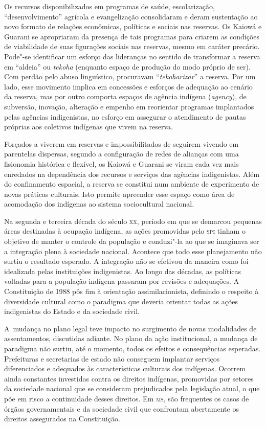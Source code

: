 Os recursos disponibilizados em programas de saúde, escolarização,
``desenvolvimento'' agrícola e evangelização consolidaram e deram
sustentação ao novo formato de relações econômicas, políticas e sociais
nas reservas. Os Kaiowá e Guarani se apropriaram da presença de tais
programas para criarem as condições de viabilidade de suas figurações
sociais nas reservas, mesmo em caráter precário. Pode"-se identificar um
esforço das lideranças no sentido de transformar a reserva em ``aldeia''
ou \emph{tekoha} (enquanto espaço de produção do modo próprio de ser). Com
perdão pelo abuso linguístico, procuravam ``\emph{tekoharizar}'' a reserva. Por
um lado, esse movimento implica em concessões e esforços de adequação
ao cenário da reserva, mas por outro comporta espaços de agência
indígena (\emph{agency}), de subversão, inovação, alteração e empenho em
reorientar programas implantados pelas agências indigenistas, no
esforço em assegurar o atendimento de pautas próprias aos coletivos
indígenas que vivem na reserva.  

Forçados a viverem em reservas e impossibilitados de seguirem vivendo em
parentelas dispersas, segundo a configuração de redes de alianças com
uma fisionomia histórica e flexível, os Kaiowá e Guarani se viram cada
vez mais enredados na dependência dos recursos e serviços das agências
indigenistas. Além do confinamento espacial, a reserva se constitui num
ambiente de experimento de novas práticas culturais. Isto permite
apreender esse espaço como área de acomodação dos indígenas ao sistema
sociocultural nacional.

Na segunda e terceira década do século \textsc{xx}, período em que se demarcou
pequenas áreas destinadas à ocupação indígena, as ações promovidas pelo
\textsc{spi} tinham o objetivo de manter o controle da população e conduzi"-la ao
que se imaginava ser a integração plena à sociedade nacional. Acontece
que todo esse planejamento não surtiu o resultado esperado. A
integração não se efetivou da maneira como foi idealizada pelas
instituições indigenistas. Ao longo das décadas, as políticas voltadas
para a população indígena passaram por revisões e adequações. A
Constituição de 1988 pôs fim à orientação assimilacionista, definindo o
respeito à diversidade cultural como o paradigma que deveria orientar
todas as ações indigenistas do Estado e da sociedade civil. 

A~mudança no plano legal teve impacto no surgimento de novas modalidades
de assentamentos, discutidas adiante. No plano da ação institucional, a
mudança de paradigma não surtiu, até o momento, todos os efeitos e
consequências esperadas. Prefeituras e secretarias de estado não
conseguem implantar serviços diferenciados e adequados às
características culturais dos indígenas. Ocorrem ainda constantes
investidas contra os direitos indígenas, promovidas por setores da
sociedade nacional que se consideram prejudicados pela legislação
atual, o que põe em risco a continuidade desses direitos. Em \textsc{ms}, são
frequentes os casos de órgãos governamentais e da sociedade civil que
confrontam abertamente os direitos assegurados na Constituição.

